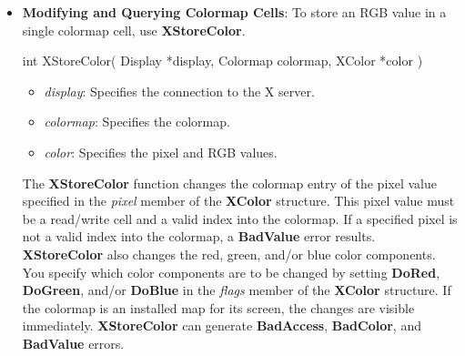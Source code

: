 \documentclass{report}
\begin{document}
\begin{itemize}
            \bigbreak \noindent
            All specified pixels that are allocated by the client in the colormap are freed, even if one or more pixels produce an error. If a specified pixel is not a valid index into the colormap, a \textbf{BadValue} error results. If a specified pixel is not allocated by the client, that is, if it is unallocated or is only allocated by another client, or if the colormap was created with all entries writable by passing \textbf{AllocAll} to \textbf{XCreateColormap}, a \textbf{BadAccess} error results. If more than one pixel is in error, the one that gets reported is arbitrary.
            \bigbreak \noindent
            \textbf{XFreeColors} can generate \textbf{BadAccess}, \textbf{BadColor}, and \textbf{BadValue} errors.
        \item \textbf{Modifying and Querying Colormap Cells}: To store an RGB value in a single colormap cell, use \textbf{XStoreColor}.
            \bigbreak \noindent
            \begin{cppcode}
                int XStoreColor(
                    Display *display,
                    Colormap colormap,
                    XColor *color
                )
            \end{cppcode}
            \begin{itemize}
                \item \textit{display}: Specifies the connection to the X server.
                \item \textit{colormap}: Specifies the colormap.
                \item \textit{color}: Specifies the pixel and RGB values.
            \end{itemize}
            \noindent
            The \textbf{XStoreColor} function changes the colormap entry of the pixel value specified in the \textit{pixel} member of the \textbf{XColor} structure. This pixel value must be a read/write cell and a valid index into the colormap. If a specified pixel is not a valid index into the colormap, a \textbf{BadValue} error results.
            \bigbreak \noindent
            \textbf{XStoreColor} also changes the red, green, and/or blue color components. You specify which color components are to be changed by setting \textbf{DoRed}, \textbf{DoGreen}, and/or \textbf{DoBlue} in the \textit{flags} member of the \textbf{XColor} structure. If the colormap is an installed map for its screen, the changes are visible immediately.
            \bigbreak \noindent
            \textbf{XStoreColor} can generate \textbf{BadAccess}, \textbf{BadColor}, and \textbf{BadValue} errors.

\end{itemize}
\end{document}

